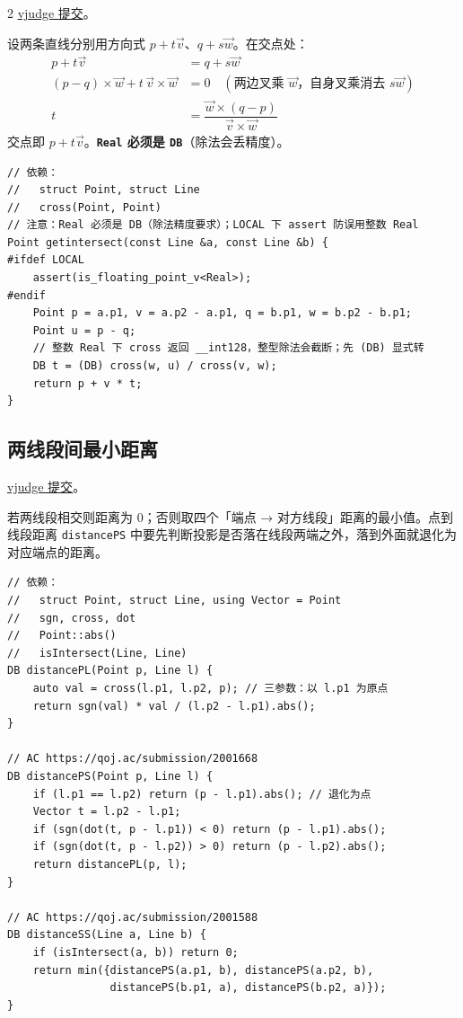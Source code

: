 \begin{multicols*}{2}
		\href{https://vjudge.net/solution/64186810}{vjudge 提交}。

		设两条直线分别用方向式 $p + t\vec{v}$、$q + s\vec{w}$。在交点处：
		\begin{align*}
			p + t\vec{v} &= q + s\vec{w} \\
			(p - q) \times \vec{w} + t\, \vec{v} \times \vec{w} &= 0 \quad (\text{两边叉乘 } \vec{w}\text{，自身叉乘消去 } s\vec{w}) \\
			t &= \dfrac{\vec{w} \times (q - p)}{\vec{v} \times \vec{w}}
		\end{align*}
		交点即 $p + t\vec{v}$。\textbf{\texttt{Real} 必须是 \texttt{DB}}（除法会丢精度）。

		\begin{verbatim}
// 依赖：
//   struct Point, struct Line
//   cross(Point, Point)
// 注意：Real 必须是 DB（除法精度要求）；LOCAL 下 assert 防误用整数 Real
Point getintersect(const Line &a, const Line &b) {
#ifdef LOCAL
	assert(is_floating_point_v<Real>);
#endif
	Point p = a.p1, v = a.p2 - a.p1, q = b.p1, w = b.p2 - b.p1;
	Point u = p - q;
	// 整数 Real 下 cross 返回 __int128，整型除法会截断；先 (DB) 显式转
	DB t = (DB) cross(w, u) / cross(v, w);
	return p + v * t;
}
		\end{verbatim}

		\subsection{两线段间最小距离}

		\href{https://vjudge.net/solution/64187931}{vjudge 提交}。

		若两线段相交则距离为 $0$；否则取四个「端点 → 对方线段」距离的最小值。点到线段距离 \texttt{distancePS} 中要先判断投影是否落在线段两端之外，落到外面就退化为对应端点的距离。

		\begin{verbatim}
// 依赖：
//   struct Point, struct Line, using Vector = Point
//   sgn, cross, dot
//   Point::abs()
//   isIntersect(Line, Line)
DB distancePL(Point p, Line l) {
	auto val = cross(l.p1, l.p2, p); // 三参数：以 l.p1 为原点
	return sgn(val) * val / (l.p2 - l.p1).abs();
}

// AC https://qoj.ac/submission/2001668
DB distancePS(Point p, Line l) {
	if (l.p1 == l.p2) return (p - l.p1).abs(); // 退化为点
	Vector t = l.p2 - l.p1;
	if (sgn(dot(t, p - l.p1)) < 0) return (p - l.p1).abs();
	if (sgn(dot(t, p - l.p2)) > 0) return (p - l.p2).abs();
	return distancePL(p, l);
}

// AC https://qoj.ac/submission/2001588
DB distanceSS(Line a, Line b) {
	if (isIntersect(a, b)) return 0;
	return min({distancePS(a.p1, b), distancePS(a.p2, b),
	            distancePS(b.p1, a), distancePS(b.p2, a)});
}
		\end{verbatim}


\end{multicols*}
